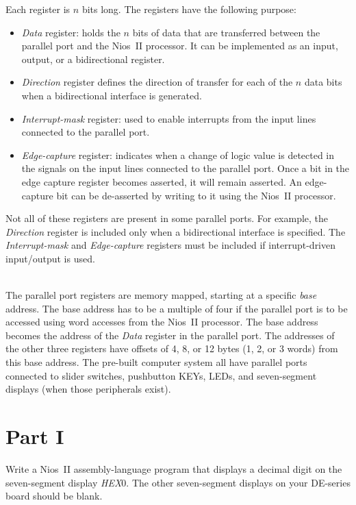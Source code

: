 \documentclass[epsfig,10pt,fullpage]{article}
\begin{document}
Each register is $n$ bits long. The registers have the following purpose:
\begin{itemize}
\item {\it Data} register: holds the $n$ bits of data that are transferred between the parallel 
port and the Nios~II processor. It can be implemented as an input, 
output, or a bidirectional register.  \item {\it Direction} register defines the direction 
 of transfer for each of the $n$ data bits when a bidirectional interface is generated.
\item {\it Interrupt-mask} register: used to enable interrupts from the
input lines connected to the parallel port.
\item {\it Edge-capture} register: indicates when a change of logic value is detected in 
the signals on the input lines connected to the parallel port. Once a bit in the edge
capture register becomes asserted, it will remain asserted. An edge-capture bit can be
de-asserted by writing to it using the Nios~II processor.
\end{itemize}

Not all of these registers are present in some parallel ports. For example,
the {\it Direction} register is included only when a bidirectional interface is specified.
The {\it Interrupt-mask} and {\it Edge-capture} registers must be included if
interrupt-driven input/output is used.

~\\
The parallel port registers are memory mapped, starting at a specific {\it base} address.
The base address has to be a multiple of four if the parallel port is to be accessed using
word accesses from the Nios~II processor. The base address becomes the address of the {\it Data} 
register in the parallel port. The addresses of the other three registers have offsets 
of 4, 8, or 12 bytes (1, 2, or 3 words) from this base address.
The pre-built computer system all have parallel ports connected to slider switches, pushbutton KEYs, 
LEDs, and seven-segment displays (when those peripherals exist).

\section*{Part I}
Write a Nios~II assembly-language program that displays a decimal digit on the seven-segment
display {\it HEX}0. The other seven-segment 
displays on your DE-series board should be blank.  
\end{document}
